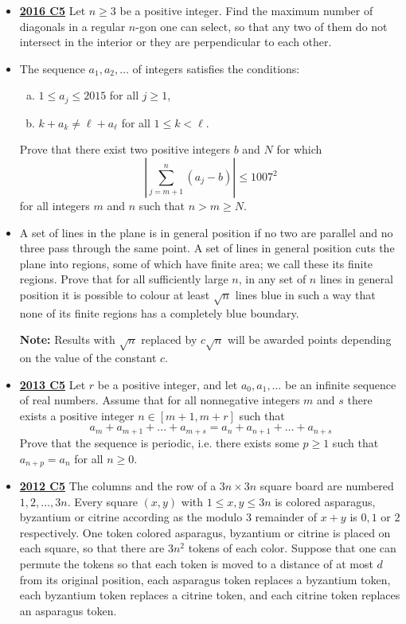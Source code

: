 \documentclass[11pt]{scrartcl}
\begin{document}
\begin{itemize}[leftmargin=*]
    \item \href{https://artofproblemsolving.com/community/c6h1480696p8639265}{\textbf{2016 C5}} 	Let $n \geqslant  3$ be a positive integer. Find the maximum number of diagonals in a regular $n$-gon one can select, so that any two of them do not intersect in the interior or they are perpendicular to each other.
    \item {} The sequence $a_1,a_2,\dots$ of integers satisfies the conditions:
\begin{enumerate}[(a)]
    \item $1\leqslant a_j\leqslant 2015$ for all $j\geqslant 1$,
    \item $k+a_k\neq \ell+a_\ell$ for all $1\leqslant k<\ell$.
\end{enumerate}
Prove that there exist two positive integers $b$ and $N$ for which\[\left\vert\sum_{j=m+1}^n(a_j-b)\right\vert\leqslant 1007^2\]for all integers $m$ and $n$ such that $n>m\geqslant N$.
\newpage
    \item {} A set of lines in the plane is in general position if no two are parallel and no three pass through the same point. A set of lines in general position cuts the plane into regions, some of which have finite area; we call these its finite regions. Prove that for all sufficiently large $n$, in any set of $n$ lines in general position it is possible to colour at least $\sqrt{n}$ lines blue in such a way that none of its finite regions has a completely blue boundary.

\textbf{Note:} Results with $\sqrt{n}$ replaced by $c\sqrt{n}$ will be awarded points depending on the value of the constant $c$.
    \item \href{https://artofproblemsolving.com/community/c6h597133p3543427}{\textbf{2013 C5}} Let $r$ be a positive integer, and let $a_0 , a_1 , \dots $ be an infinite sequence of real numbers. Assume that for all nonnegative integers $m$ and $s$ there exists a positive integer $n \in [m+1, m+r]$ such that
\[ a_m + a_{m+1} +\dots +a_{m+s} = a_n + a_{n+1} +\dots +a_{n+s} \]
Prove that the sequence is periodic, i.e. there exists some $p \geqslant 1 $ such that $a_{n+p} =a_n $ for all $n \geqslant 0$.
    \item \href{https://artofproblemsolving.com/community/c6h546172p3160571}{\textbf{2012 C5}} The columns and the row of a $3n \times 3n$ square board are numbered $1,2,\dots ,3n$. Every square $(x,y)$ with $1 \leqslant x,y \leqslant 3n$ is colored asparagus, byzantium or citrine according as the modulo $3$ remainder of $x+y$ is $0,1$ or $2$ respectively. One token colored asparagus, byzantium or citrine is placed on each square, so that there are $3n^2$ tokens of each color. Suppose that one can permute the tokens so that each token is moved to a distance of at most $d$ from its original position, each asparagus token replaces a byzantium token, each byzantium token replaces a citrine token, and each citrine token replaces an asparagus token. 
    

\end{itemize}
\end{document}
